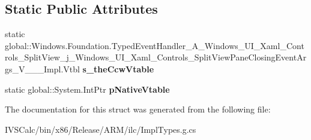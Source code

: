 \subsection*{Static Public Attributes}
\begin{DoxyCompactItemize}
\item 
\mbox{\label{struct_windows_1_1_foundation_1_1_typed_event_handler___a___windows___u_i___xaml___controls___spf724c7b43c58a64da16977f053e6f78f_abc85ede8f181783d83305deb549ac15a}} 
static global\+::\+Windows.\+Foundation.\+Typed\+Event\+Handler\+\_\+\+A\+\_\+\+Windows\+\_\+\+U\+I\+\_\+\+Xaml\+\_\+\+Controls\+\_\+\+Split\+View\+\_\+j\+\_\+\+Windows\+\_\+\+U\+I\+\_\+\+Xaml\+\_\+\+Controls\+\_\+\+Split\+View\+Pane\+Closing\+Event\+Args\+\_\+\+V\+\_\+\+\_\+\+\_\+\+Impl.\+Vtbl {\bfseries s\+\_\+the\+Ccw\+Vtable}
\item 
\mbox{\label{struct_windows_1_1_foundation_1_1_typed_event_handler___a___windows___u_i___xaml___controls___spf724c7b43c58a64da16977f053e6f78f_afcdc8aa2f869d73f09d2e0e984cf7986}} 
static global\+::\+System.\+Int\+Ptr {\bfseries p\+Native\+Vtable}
\end{DoxyCompactItemize}


The documentation for this struct was generated from the following file\+:\begin{DoxyCompactItemize}
\item 
I\+V\+S\+Calc/bin/x86/\+Release/\+A\+R\+M/ilc/Impl\+Types.\+g.\+cs\end{DoxyCompactItemize}
